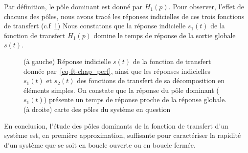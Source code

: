 Par définition, le pôle dominant est donné par $H_1(p)$.
Pour observer, l'effet de chacuns des pôles, nous avons tracé 
les réponses indicielles de ces trois fonctions de transfert
(c.f~\cref{fig-poles_dominants})
Nous constatons que la réponse indicielle $s_1(t)$ de la fonction
de transfert $H_1(p)$ domine le temps de réponse de la sortie
globale $s(t)$.
\begin{figure}[!h]
    \centering
    
    \caption{(à gauche) Réponse indicielle $s(t)$ de la fonction de 
             transfert donnée par~\cref{eq-ft-chap_perf}, ainsi que les 
             réponses indicielles $s_1(t)$ et $s_2(t)$ des fonctions de 
             transfert de sa décomposition en éléments simples. 
             On constate que la réponse du pôle dominant ($s_1(t)$) 
             présente un temps de réponse proche de la réponse globale. 
             (à droite) carte des pôles du système en question
             \label{fig-poles_dominants}}
\end{figure}
En conclusion, l'étude des pôles dominants de la fonction de transfert 
d'un système est, en première approximation, suffisante pour caractériser 
la rapidité d'un système que se soit en boucle ouverte ou en boucle fermée.

